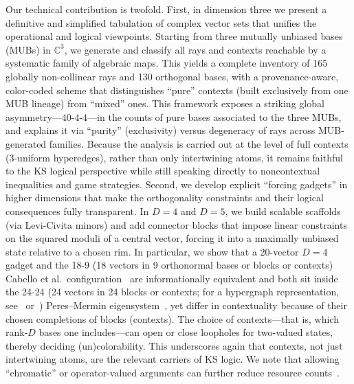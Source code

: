 \documentclass[%
  reprint,
  superscriptaddress,
  showpacs,
  showkeys,
  amsmath,amssymb,
  pra,
  longbibliography,
  floatfix,
  x11names
]{revtex4-2}
\begin{document}
Our technical contribution is twofold.
First, in dimension three we present a definitive and simplified tabulation of complex vector sets
that unifies the operational and logical viewpoints.
Starting from three mutually unbiased bases (MUBs) in $\mathbb{C}^3$,
we generate and classify all rays and contexts reachable by a systematic family of algebraic maps.
This yields a complete inventory of 165 globally non-collinear rays and 130 orthogonal bases,
 with a provenance-aware, color-coded scheme that distinguishes ``pure'' contexts
(built exclusively from one MUB lineage) from ``mixed'' ones.
This framework exposes a striking global asymmetry---40-4-4---in the counts of pure bases associated to the three MUBs,
and explains it via ``purity'' (exclusivity) versus degeneracy of rays across MUB-generated families.
Because the analysis is carried out at the level of full contexts (3-uniform hyperedges),
rather than only intertwining atoms, it remains faithful to the KS logical perspective
while still speaking directly to noncontextual inequalities and game strategies.
Second, we develop explicit ``forcing gadgets'' in higher dimensions that make the orthogonality constraints
and their logical consequences fully transparent.
In $D=4$ and $D=5$, we build scalable scaffolds (via Levi-Civita minors)
and add connector blocks that impose linear constraints on the squared moduli
of a central vector, forcing it into a maximally unbiased state relative to a chosen rim.
In particular, we show that a 20-vector $D=4$ gadget and the 18-9 (18 vectors in 9 orthonormal bases or blocks or contexts) Cabello et al.\
configuration~\cite{cabello-96,cabello:210401} are informationally equivalent and both sit inside the 24-24
(24 vectors in 24 blocks or contexts; for a hypergraph representation, see~\cite[Figs.~4(c,d)]{pavicic-2004ksafq} or~\cite[Fig.~1(a)]{svozil-2024-convert-pra-externalfigures})
Peres--Mermin eigensystem~\cite{peres111,mermin90b,peres-91,pavicic-2004ksafq,Pavicic-2005,pavicic-2005csvcorri,cabello2021contextuality,svozil-2024-convert-pra-externalfigures}, yet differ in contextuality because of their chosen completions of blocks (contexts). The choice of contexts---that is, which rank-$D$ bases one includes---can open or close loopholes for two-valued states, thereby deciding (un)colorability. This underscores again that contexts, not just intertwining atoms, are the relevant carriers of KS logic.
We note that allowing ``chromatic'' or operator-valued arguments can further reduce resource counts~\cite{svozil-2025-color}.
\end{document}
